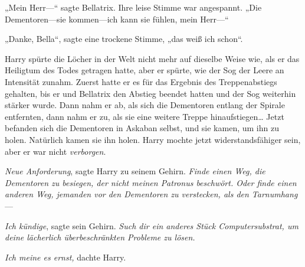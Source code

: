 „Mein Herr—“ sagte Bellatrix. Ihre leise Stimme war angespannt. „Die Dementoren—sie kommen—ich kann sie fühlen, mein Herr—“

„Danke, Bella“, sagte eine trockene Stimme, „das weiß ich schon“.

Harry spürte die Löcher in der Welt nicht mehr auf dieselbe Weise wie, als er das Heiligtum des Todes getragen hatte, aber er spürte, wie der Sog der Leere an Intensität zunahm. Zuerst hatte er es für das Ergebnis des Treppenabstiegs gehalten, bis er und Bellatrix den Abstieg beendet hatten und der Sog weiterhin stärker wurde. Dann nahm er ab, als sich die Dementoren entlang der Spirale entfernten, dann nahm er zu, als sie eine weitere Treppe hinaufstiegen… Jetzt befanden sich die Dementoren in Askaban selbst, und sie kamen, um ihn zu holen. Natürlich kamen sie ihn holen. Harry mochte jetzt widerstandsfähiger sein, aber er war nicht \emph{verborgen}.

\emph{Neue Anforderung}, sagte Harry zu seinem Gehirn. \emph{Finde einen Weg, die Dementoren zu besiegen, der nicht meinen Patronus beschwört. Oder finde einen anderen Weg, jemanden vor den Dementoren zu verstecken, als den Tarnumhang}—

\emph{Ich kündige}, sagte sein Gehirn. \emph{Such dir ein anderes Stück Computersubstrat, um deine lächerlich überbeschränkten Probleme zu lösen.}

\emph{Ich meine es ernst,} dachte Harry.

